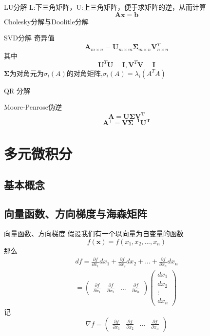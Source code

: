 \documentclass{ctexbeamer}
\begin{document}
\begin{frame}{LU分解}
    L:下三角矩阵，U:上三角矩阵，便于求矩阵的逆，从而计算
    $$\boldsymbol{Ax=b} $$
    Cholesky分解与Doolitle分解
\end{frame}

\begin{frame}{SVD分解}
    奇异值
    $$\boldsymbol{A}_{m\times n}=\boldsymbol{U}_{m\times m}\boldsymbol{\Sigma}_{m\times n}\boldsymbol{V}_{n\times n}^T$$
    其中
    $$\boldsymbol{U}^T\boldsymbol{U}=\boldsymbol{I},\boldsymbol{V}^T\boldsymbol{V}=\boldsymbol{I}$$
$\boldsymbol{\Sigma}$为对角元为$\sigma_i(A)$的对角矩阵,$\sigma_i(A)=\lambda_i(A^TA)$

QR 分解
\end{frame}

\begin{frame}{Moore-Penrose伪逆}
$$\boldsymbol{A=U\Sigma V^T}$$  
$$\boldsymbol{A^+=V\Sigma^{-1} U^T}$$    
\end{frame}


\section{多元微积分}
\subsection{基本概念}
\subsection{向量函数、方向梯度与海森矩阵}
\begin{frame}{向量函数、方向梯度}
    假设我们有一个以向量为自变量的函数
    $$f(\boldsymbol{x})=f(x_1,x_2,...,x_n)$$
    那么
    \begin{equation*}
    \begin{split}
        df = \frac{\partial f}{\partial x_1}d x_1 + \frac{\partial f}{\partial x_2}dx_2 +...+\frac{\partial f}{\partial x_n}dx_n\\
        =\left(\begin{array}{cccc}
         \frac{\partial f}{\partial x_1}&\frac{\partial f}{\partial x_2}&...&\frac{\partial f}{\partial x_n}
        \end{array}\right)
        \left(\begin{array}{c}
        dx_1\\dx_2\\\vdots\\dx_n
        \end{array}\right)
	\end{split}
            \end{equation*}
    记
    $$\nabla f = \left(\begin{array}{cccc}
         \frac{\partial f}{\partial x_1}&\frac{\partial f}{\partial x_2}&...&\frac{\partial f}{\partial x_n}
        \end{array}\right)$$
\end{frame}
\end{document}
